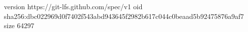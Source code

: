 version https://git-lfs.github.com/spec/v1
oid sha256:dbc022969d0f7402f543abd943645f2982b617c044c0beaad5b92475876a9af7
size 64297
